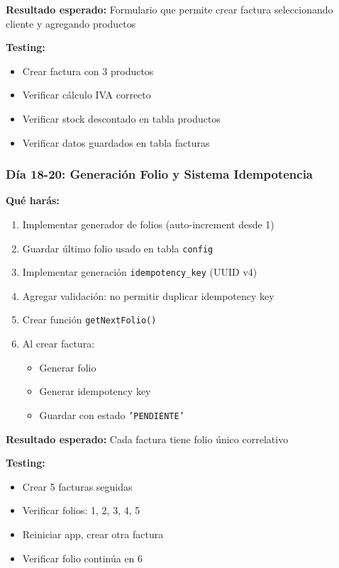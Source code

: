 \documentclass[11pt,a4paper]{article}
\begin{document}
\textbf{Resultado esperado:} Formulario que permite crear factura seleccionando cliente y agregando productos

\textbf{Testing:}
\begin{itemize}
    \item Crear factura con 3 productos
    \item Verificar cálculo IVA correcto
    \item Verificar stock descontado en tabla productos
    \item Verificar datos guardados en tabla facturas
\end{itemize}

\subsubsection{Día 18-20: Generación Folio y Sistema Idempotencia}

\textbf{Qué harás:}
\begin{enumerate}
    \item Implementar generador de folios (auto-increment desde 1)
    \item Guardar último folio usado en tabla \texttt{config}
    \item Implementar generación \texttt{idempotency\_key} (UUID v4)
    \item Agregar validación: no permitir duplicar idempotency key
    \item Crear función \texttt{getNextFolio()}
    \item Al crear factura:
    \begin{itemize}
        \item Generar folio
        \item Generar idempotency key
        \item Guardar con estado \texttt{'PENDIENTE'}
    \end{itemize}
\end{enumerate}

\textbf{Resultado esperado:} Cada factura tiene folio único correlativo

\textbf{Testing:}
\begin{itemize}
    \item Crear 5 facturas seguidas
    \item Verificar folios: 1, 2, 3, 4, 5
    \item Reiniciar app, crear otra factura
    \item Verificar folio continúa en 6
\end{itemize}
\end{document}
